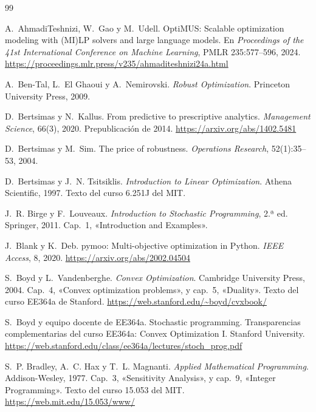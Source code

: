 \begin{thebibliography}{99}
\small

A.~AhmadiTeshnizi, W.~Gao y M.~Udell.
\newblock OptiMUS: Scalable optimization modeling with (MI)LP solvers and large language models.
\newblock En \emph{Proceedings of the 41st International Conference on Machine Learning}, PMLR 235:577--596, 2024.
\newblock \url{https://proceedings.mlr.press/v235/ahmaditeshnizi24a.html}

A.~Ben-Tal, L.~El Ghaoui y A.~Nemirovski.
\newblock \emph{Robust Optimization}.
\newblock Princeton University Press, 2009.

D.~Bertsimas y N.~Kallus.
\newblock From predictive to prescriptive analytics.
\newblock \emph{Management Science}, 66(3), 2020. Prepublicación de 2014.
\newblock \url{https://arxiv.org/abs/1402.5481}

D.~Bertsimas y M.~Sim.
\newblock The price of robustness.
\newblock \emph{Operations Research}, 52(1):35--53, 2004.

D.~Bertsimas y J.~N. Tsitsiklis.
\newblock \emph{Introduction to Linear Optimization}.
\newblock Athena Scientific, 1997. Texto del curso 6.251J del MIT.

J.~R. Birge y F.~Louveaux.
\newblock \emph{Introduction to Stochastic Programming}, 2.ª ed.
\newblock Springer, 2011. Cap.~1, «Introduction and Examples».

J.~Blank y K.~Deb.
\newblock pymoo: Multi-objective optimization in Python.
\newblock \emph{IEEE Access}, 8, 2020.
\newblock \url{https://arxiv.org/abs/2002.04504}

S.~Boyd y L.~Vandenberghe.
\newblock \emph{Convex Optimization}.
\newblock Cambridge University Press, 2004. Cap.~4, «Convex optimization problems», y cap.~5, «Duality». Texto del curso EE364a de Stanford.
\newblock \url{https://web.stanford.edu/~boyd/cvxbook/}

S.~Boyd y equipo docente de EE364a.
\newblock Stochastic programming. Transparencias complementarias del curso EE364a: Convex Optimization I.
\newblock Stanford University.
\newblock \url{https://web.stanford.edu/class/ee364a/lectures/stoch_prog.pdf}

S.~P. Bradley, A.~C. Hax y T.~L. Magnanti.
\newblock \emph{Applied Mathematical Programming}.
\newblock Addison-Wesley, 1977. Cap.~3, «Sensitivity Analysis», y cap.~9, «Integer Programming». Texto del curso 15.053 del MIT.
\newblock \url{https://web.mit.edu/15.053/www/}


\end{thebibliography}
